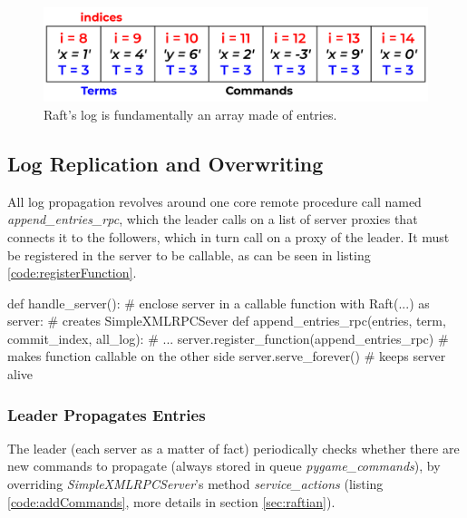 \begin{figure}[h]
  \centering
  \includegraphics[width=.8\linewidth]{images/logStructure.png}
  
  \caption{Raft's log is fundamentally an array made of entries.}
  \label{fig:logStructure}
\end{figure}

\subsection{Log Replication and Overwriting}

All log propagation revolves around one core remote procedure call named \textit{append\_entries\_rpc}, which the leader calls on a list of server proxies that connects it to the followers, which in turn call on a proxy of the leader. It must be registered in the server to be callable, as can be seen in listing \ref{code:registerFunction}.

\begin{python}[label={code:registerFunction}, caption={Register, thus making it callable, the remote procedure call \textit{append\_entries\_rpc}}]
def handle_server():                                    # enclose server in a callable function
    with Raft(...) as server:                           # creates SimpleXMLRPCSever
        def append_entries_rpc(entries, term, commit_index, all_log):
            # ...
        server.register_function(append_entries_rpc)    # makes function callable on the other side
        server.serve_forever()                          # keeps server alive 
\end{python}

\subsubsection{Leader Propagates Entries} \label{sec:leaderSends}

The leader (each server as a matter of fact) periodically checks whether there are new commands to propagate (always stored in queue \textit{pygame\_commands}), by overriding \textit{SimpleXMLRPCServer}'s method \textit{service\_actions} (listing \ref{code:addCommands}, more details in section \ref{sec:raftian}).

